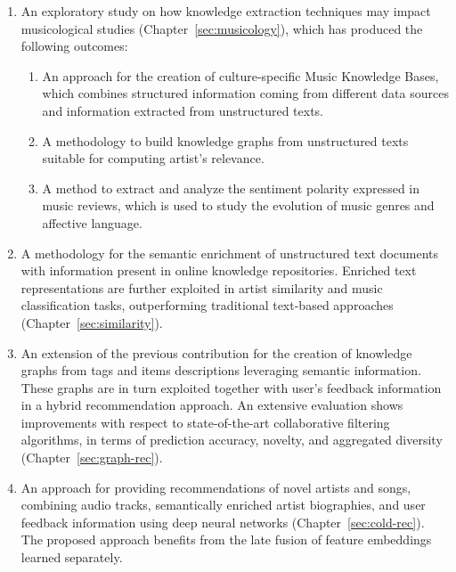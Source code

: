 \begin{enumerate}
\item 
An exploratory study on how knowledge extraction techniques may impact musicological studies (Chapter~\ref{sec:musicology}), which has produced the following outcomes:
\begin{enumerate}
\item 
An approach for the creation of culture-specific Music Knowledge Bases, which combines structured information coming from different data sources and information extracted from unstructured texts. 
\item
A methodology to build knowledge graphs from unstructured texts suitable for computing artist's relevance.
\item 
A method to extract and analyze the sentiment polarity expressed in music reviews, which is used to study the evolution of music genres and affective language.
\end{enumerate}

\item 
A methodology for the semantic enrichment of unstructured text documents with information present in online knowledge repositories. Enriched text representations are further exploited in artist similarity and music classification tasks, outperforming traditional text-based approaches (Chapter~\ref{sec:similarity}).

\item
An extension of the previous contribution for the creation of knowledge graphs from tags and items descriptions leveraging semantic information. These graphs are in turn exploited together with user's feedback information in a hybrid recommendation approach. An extensive evaluation shows improvements with respect to state-of-the-art collaborative filtering algorithms, in terms of prediction accuracy, novelty, and aggregated diversity (Chapter~\ref{sec:graph-rec}).%

\item 
An approach for providing recommendations of novel artists and songs, combining audio tracks, semantically enriched artist biographies, and user feedback information using deep neural networks (Chapter~\ref{sec:cold-rec}). The proposed approach benefits from the late fusion of feature embeddings learned separately. %


\end{enumerate}
